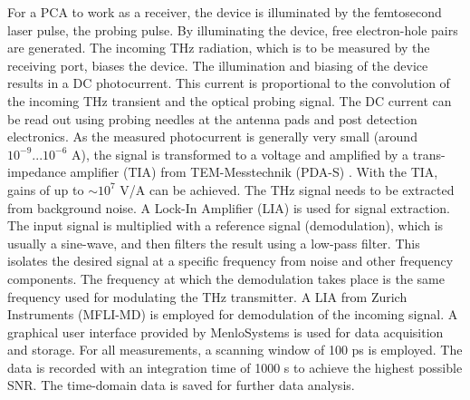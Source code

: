 For a PCA to work as a receiver, the device is illuminated by the femtosecond laser pulse, the probing pulse. By illuminating the device, free electron-hole pairs are generated. The incoming THz radiation, which is to be measured by the receiving port, biases the device. The illumination and biasing of the device results in a DC photocurrent. This current is proportional to the convolution of the incoming THz transient and the optical probing signal. The DC current can be read out using probing needles at the antenna pads and post detection electronics. As the measured photocurrent is generally very small (around $10^{-9} ... 10^{-6}$ \si{\ampere}), the signal is transformed to a voltage and amplified by a trans-impedance amplifier (TIA) from TEM-Messtechnik (PDA-S) \cite{PDASPhotodiodenVerstaerker}. With the TIA, gains of up to $\sim 10^7 $ \si{\volt}/\si{\ampere} can be achieved. The THz signal needs to be extracted from background noise. A Lock-In Amplifier (LIA) is used for signal extraction. The input signal is multiplied with a reference signal (demodulation), which is usually a sine-wave, and then filters the result using a low-pass filter. This isolates the desired signal at a specific frequency from noise and other frequency components. The frequency at which the demodulation takes place is the same frequency used for modulating the THz transmitter. A LIA from Zurich Instruments (MFLI-MD) \cite{MFLI500KHz2019} is employed for demodulation of the incoming signal. A graphical user interface provided by MenloSystems is used for data acquisition and storage. For all measurements, a scanning window of \num{100} \si{\pico \s} is employed. The data is recorded with an integration time of \num{1000} \si{\s} to achieve the highest possible SNR. The time-domain data is saved for further data analysis.